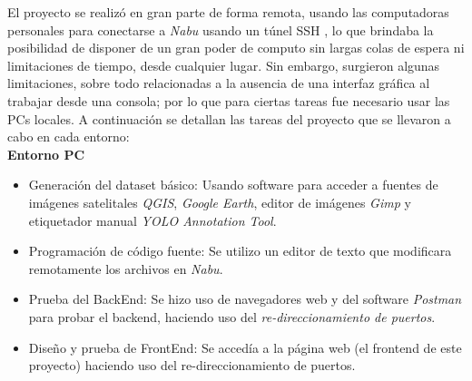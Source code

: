 El proyecto se realizó en gran parte de forma remota, usando las computadoras personales para conectarse a \textit{Nabu} usando un túnel SSH \cite{ssh}, lo que brindaba la posibilidad de disponer de un gran poder de computo sin largas colas de espera ni limitaciones de tiempo, desde cualquier lugar. Sin embargo, surgieron algunas limitaciones, sobre todo relacionadas a la ausencia de una  interfaz gráfica al trabajar desde una consola; por lo que para ciertas tareas fue necesario usar las PCs locales. A continuación se detallan las tareas del proyecto que se llevaron a cabo en cada entorno:\\

\textbf{Entorno PC}
\begin{itemize}
    \item Generación del dataset básico: Usando software para acceder a fuentes de imágenes satelitales \textit{QGIS}, \textit{Google Earth}, editor de imágenes \textit{Gimp} y etiquetador manual \textit{YOLO Annotation Tool}.
    \item Programación de código fuente: Se utilizo un editor de texto que modificara remotamente los archivos en \textit{Nabu}.
    \item Prueba del BackEnd: Se hizo uso de navegadores web y del software \textit{Postman} para probar el backend, haciendo uso del \textit{re-direccionamiento de puertos}.
    \item Diseño y prueba de FrontEnd: Se accedía a la página web (el frontend de este proyecto) haciendo uso del re-direccionamiento de puertos.\\
\end{itemize}

